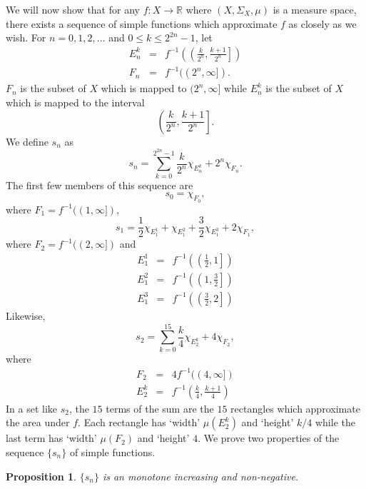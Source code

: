 \documentclass{article}
\newcommand{\sor}{\mathbb{R}}
\theoremstyle{plain}
\numberwithin{thm}{section}
\theoremstyle{plain}
\newtheorem{prop}{Proposition}
\numberwithin{prop}{section}
\theoremstyle{definition}
\numberwithin{defn}{section}
\theoremstyle{remark}
\theoremstyle{plain}
\numberwithin{cor}{section}
\numberwithin{equation}{section}
\begin{document}
We will now show that for any $f:X \rightarrow \sor$ where $(X, \Sigma_X, \mu)$
is a measure space, there exists a sequence of simple functions which approximate
$f$ as closely as we wish. For $n = 0, 1, 2, \ldots$ and $0 \le k \le 2^{2n} - 1$,
let
\begin{eqnarray*}
E_n^k &=& f^{-1}\left(\left(\frac{k}{2^n}, \frac{k+1}{2^n}\right]\right) \\
F_n &=& f^{-1}((2^n, \infty]).
\end{eqnarray*}
$F_n$ is the subset of $X$ which is mapped to $(2^n, \infty]$ while $E_n^k$ is
the subset of $X$ which is mapped to the interval 
\[
\left(\frac{k}{2^n}, \frac{k+1}{2^n}\right].
\]
We define $s_n$ as 
\begin{equation}\label{s3e1}
s_n = \sum_{k=0}^{2^{2n}-1}\frac{k}{2^n}\chi_{E_n^k} + 2^n\chi_{F_n}.
\end{equation}
The first few members of this sequence are
\begin{equation}\label{s3e2}
s_0 = \chi_{F_0},
\end{equation}
where $F_1 = f^{-1}((1, \infty])$,
\begin{equation}\label{c3e3}
s_1 = \frac{1}{2}\chi_{E_1^1} + \chi_{E_1^2} + \frac{3}{2}\chi_{E_1^3} + 2\chi_{F_1},
\end{equation}
where $F_2 = f^{-1}((2, \infty])$ and
\begin{eqnarray*}
E_1^1 &=& f^{-1}\left(\left(\frac{1}{2}, 1\right]\right) \\
E_1^2 &=& f^{-1}\left(\left(1, \frac{3}{2}\right]\right) \\
E_1^3 &=& f^{-1}\left(\left(\frac{3}{2}, 2\right]\right)
\end{eqnarray*}
Likewise,
\begin{equation}\label{s3e3}
s_2 = \sum_{k=0}^{15}\frac{k}{4}\chi_{E_2^k} + 4\chi_{F_2},
\end{equation}
where
\begin{eqnarray*}
F_2 &=& 4f^{-1}((4, \infty]) \\
E_2^k &=& f^{-1}\left(\frac{k}{4}, \frac{k+1}{4}\right)
\end{eqnarray*}
In a set like $s_2$, the $15$ terms of the sum are the $15$ rectangles which
approximate the area under $f$. Each rectangle has `width' $\mu(E_2^k)$ and
`height' $k/4$ while the last term has `width' $\mu(F_2)$ and `height' $4$.
We prove two properties of the sequence $\{s_n\}$ of simple functions.
\begin{prop}\label{s3p6}
$\{s_n\}$ is an monotone increasing and non-negative.
\end{prop}
\end{document}
